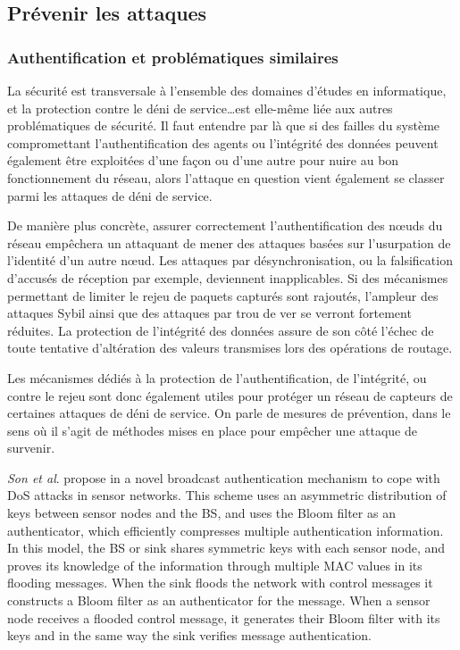 \subsection{Prévenir les attaques}

    \subsubsection{Authentification et problématiques similaires}

La sécurité est transversale à l'ensemble des domaines d'études en informatique, et la protection contre le déni de service\dots est elle-même liée aux autres problématiques de sécurité.
Il faut entendre par là que si des failles du système compromettant l'authentification des agents ou l'intégrité des données peuvent également être exploitées d'une façon ou d'une autre pour nuire au bon fonctionnement du réseau, alors l'attaque en question vient également se classer parmi les attaques de déni de service.

De manière plus concrète, assurer correctement l'authentification des nœuds du réseau empêchera un attaquant de mener des attaques basées sur l'usurpation de l'identité d'un autre nœud.
Les attaques par désynchronisation, ou la falsification d'accusés de réception par exemple, deviennent inapplicables.
Si des mécanismes permettant de limiter le rejeu de paquets capturés sont rajoutés, l'ampleur des attaques Sybil ainsi que des attaques par trou de ver se verront fortement réduites.
La protection de l'intégrité des données assure de son côté l'échec de toute tentative d'altération des valeurs transmises lors des opérations de routage.

Les mécanismes dédiés à la protection de l'authentification, de l'intégrité, ou contre le rejeu sont donc également utiles pour protéger un réseau de capteurs de certaines attaques de déni de service.
On parle de mesures de prévention, dans le sens où il s'agit de méthodes mises en place pour empêcher une attaque de survenir.



\textit{Son et al}. propose in
\cite{SLS10}
a novel broadcast authentication mechanism to cope with DoS attacks in sensor networks.
This scheme uses an asymmetric distribution of keys between sensor nodes and the BS, and uses the Bloom filter as an authenticator, which efficiently compresses multiple authentication information.
In this model, the BS or sink shares symmetric keys with each sensor node, and proves its knowledge of the information through multiple MAC values in its flooding messages.
When the sink floods the network with control messages it constructs a Bloom filter as an authenticator for the message.
When a sensor node receives a flooded control message, it generates their Bloom filter with its keys and in the same way the sink verifies message authentication.

